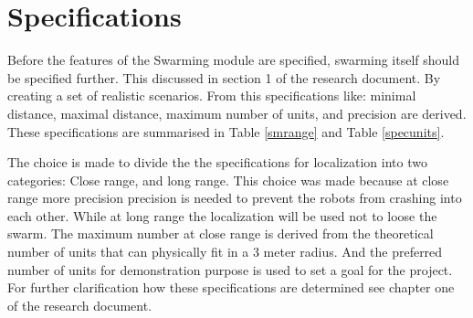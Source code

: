 \documentclass[10pt,a4paper]{article}
\begin{document}
\section{Specifications}
Before the features of the Swarming module are specified, swarming itself should be specified further. This discussed in section 1 of the research document. By creating a set of realistic scenarios. From this specifications like: minimal distance, maximal distance, maximum number of units, and precision are derived. These specifications are summarised in Table \ref{smrange} and Table \ref{specunits}. 

\begin{table}[h]
\centering
{}
\caption{Swarming localization specifications}
\label{smrange}
\end{table}

\begin{table}[h]
\centering
{}
\caption{Specifications number of units}
\label{specunits}
\end{table}


The choice is made to divide the the specifications for localization into two categories: Close range, and long range. This choice was made because at close range more precision precision is needed to prevent the robots from crashing into each other. While at long range the localization will be used not to loose the swarm. The maximum number at close range is derived from the theoretical number of units that can physically fit in a 3 meter radius. And the preferred number of units for demonstration purpose is used to set a goal for the project. For further clarification how these specifications are determined see chapter one of the research document.
\end{document}
